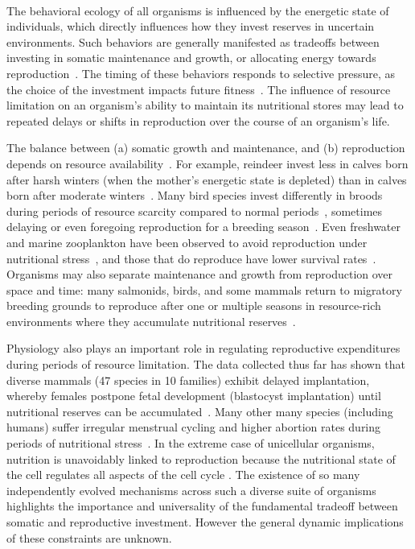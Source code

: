 \documentclass{pnastwo}
\begin{document}
\begin{article}
\vspace{2mm}

 \\
The behavioral ecology of all organisms is influenced by the energetic state of individuals, which directly influences how they invest reserves in uncertain environments.
Such behaviors are generally manifested as tradeoffs between investing in somatic maintenance and growth, or allocating energy towards reproduction~\cite{Martin:1987dl,Kirk:1997cc,Kempes:2012hy}.
The timing of these behaviors responds to selective pressure, as the choice of the investment impacts future fitness~\cite{Mangel:1988uaa,Mangel:2014kz,Yeakel:2013hi}.
The influence of resource limitation on an organism's ability to maintain its nutritional stores may lead to repeated delays or shifts in reproduction over the course of an organism's life.

The balance between (a) somatic growth and maintenance, and (b) reproduction depends on resource availability~\cite{Morris:1987eo}.
For example, reindeer invest less in calves born after harsh winters (when the mother's energetic state is depleted) than in calves born after moderate winters~\cite{Tveraa:2003fq}.
Many bird species invest differently in broods during periods of resource scarcity compared to normal periods~\cite{Daan:1988va,Jacot:2009dv}, sometimes delaying or even foregoing reproduction for a breeding season~\cite{Martin:1987dl,Stearns:1989ip,Barboza:2002in}.
Even freshwater and marine zooplankton have been observed to avoid reproduction under nutritional stress~\cite{Threlkeld:1976ih}, and those that do reproduce have lower survival rates~\cite{Kirk:1997cc}.
Organisms may also separate maintenance and growth from reproduction over space and time: many salmonids, birds, and some mammals return to migratory breeding grounds to reproduce after one or multiple seasons in resource-rich environments where they accumulate nutritional reserves~\cite{Weber:1998jg,Mduma:1999cp,Moore:2014hi}.

Physiology also plays an important role in regulating reproductive expenditures during periods of resource limitation.
The data collected thus far has shown that diverse mammals (47 species in 10 families) exhibit delayed implantation, whereby females postpone fetal development (blastocyst implantation) until nutritional reserves can be accumulated~\cite{Mead:1989dt,Sandell:1990kw}.
Many other many species (including humans) suffer irregular menstrual cycling and higher abortion rates during periods of nutritional stress~\cite{Bulik:1999eo,Trites:2003cc}.
In the extreme case of unicellular organisms, nutrition is unavoidably linked to reproduction because the nutritional state of the cell regulates all aspects of the cell cycle \cite{Glazier:2009hq}.
The existence of so many independently evolved mechanisms across such a diverse suite of organisms highlights the importance and universality of the fundamental tradeoff between somatic and reproductive investment.
However the general dynamic implications of these constraints are unknown.


\end{article}
\end{document}
